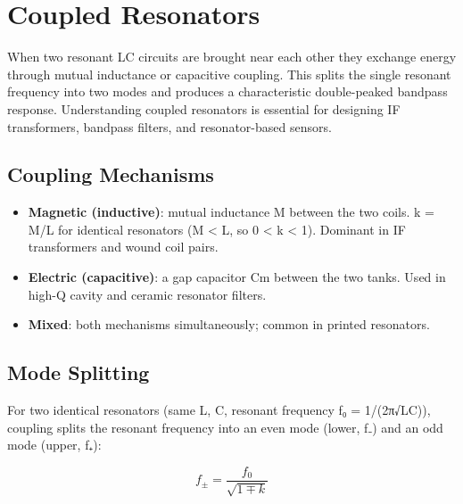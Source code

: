 \section{Coupled Resonators}\label{sec:wiki_coupled_resonators}



When two resonant LC circuits are brought near each other they exchange energy through mutual inductance or capacitive coupling. This splits the single resonant frequency into two modes and produces a characteristic double-peaked bandpass response. Understanding coupled resonators is essential for designing IF transformers, bandpass filters, and resonator-based sensors.

				

\subsection{Coupling Mechanisms}

				
\begin{itemize}

					\item \textbf{Magnetic (inductive)}: mutual inductance M between the two coils. k = M/L for identical resonators (M \textless{} L, so 0 \textless{} k \textless{} 1). Dominant in IF transformers and wound coil pairs.

					\item \textbf{Electric (capacitive)}: a gap capacitor Cm between the two tanks. Used in high-Q cavity and ceramic resonator filters.

					\item \textbf{Mixed}: both mechanisms simultaneously; common in printed resonators.

				
\end{itemize}

				

\subsection{Mode Splitting}

				

For two identical resonators (same L, C, resonant frequency f₀ = 1/(2π√LC)), coupling splits the resonant frequency into an even mode (lower, f₋) and an odd mode (upper, f₊):

				
\[f_{\pm} = \dfrac{f_0}{\sqrt{1 \mp k}}\]

				

